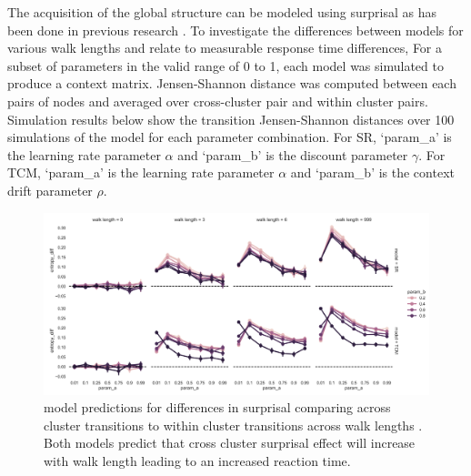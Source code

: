 The acquisition of the global structure can be modeled using surprisal as has been done in previous research \cite{lynn2020abstract,lynn2020humans,lynn2020human}. To investigate the differences between models for various walk lengths and relate to measurable response time differences,  For a subset of parameters in the valid range of 0 to 1, each model was simulated to produce a context matrix. Jensen-Shannon distance was computed between each pairs of nodes and averaged over cross-cluster pair and within cluster pairs. Simulation results below show the transition Jensen-Shannon distances over 100 simulations of the model for each parameter combination. For SR, `param\_a' is the learning rate parameter $\alpha$ and `param\_b' is the discount parameter $\gamma$. For TCM, `param\_a' is the learning rate parameter $\alpha$ and `param\_b' is the context drift parameter $\rho$. 
\begin{figure}
	\centering
	\includegraphics[width = \textwidth]{chapter_notebooks/chapter_2/figures/SR_TCM_boundary_nonboundary_jsdist.png}
	\caption{ model predictions for differences in surprisal comparing across cluster transitions to within cluster transitions across walk lengths . Both models predict that cross cluster surprisal effect will increase with walk length leading to an increased reaction time.}
	\label{fig:SR-TCM-walklength-transition-sjdist}
\end{figure}

